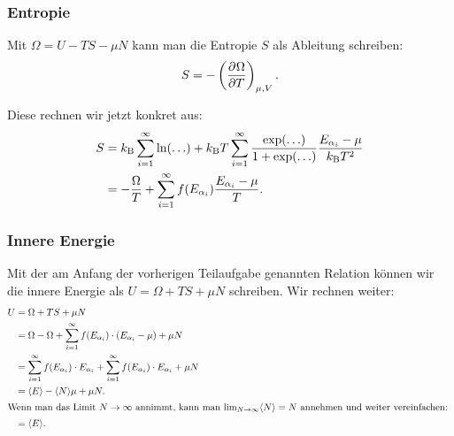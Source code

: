 \subsubsection{Entropie}

Mit $\Omega = U - TS - \mu N$ kann man die Entropie $S$ als Ableitung schreiben:
\[
    S = - \tdpd\Omega T{\mu, V}.
\]

Diese rechnen wir jetzt konkret aus:
\begin{align*}
    S &= k_\text B \sum_{i=1}^\infty \ln(\ldots) + k_\text B T \sum_{i=1}^\infty \frac{\exp(\ldots)}{1 + \exp(\ldots)} \frac{E_{\alpha_i} - \mu}{k_\text B T^2} \\
      &= - \frac\Omega T + \sum_{i=1}^\infty f(E_{\alpha_i}) \frac{E_{\alpha_i} - \mu}T.
\end{align*}

\subsubsection{Innere Energie}

Mit der am Anfang der vorherigen Teilaufgabe genannten Relation können wir die innere Energie als $U = \Omega + TS + \mu N$ schreiben. Wir rechnen weiter:
\begin{align*}
    U &= \Omega + TS + \mu N \\
      &= \Omega - \Omega + \isum f(\Eai) \cdot (\Eai - \mu) + \mu N \\
      &= \isum f(\Eai) \cdot \Eai + \isum f(\Eai) \cdot \Eai + \mu N \\
      &= \bracket E - \bracket N \mu + \mu N. \\
    \intertext{%
        Wenn man das Limit $N \to \infty$ annimmt, kann man $\lim_{N\to\infty}
        \bracket N = N$ annehmen und weiter vereinfachen:
    }
      &= \bracket E.
\end{align*}

\IfFileExists{\bibliographyfile}{
    \printbibliography
}{}



